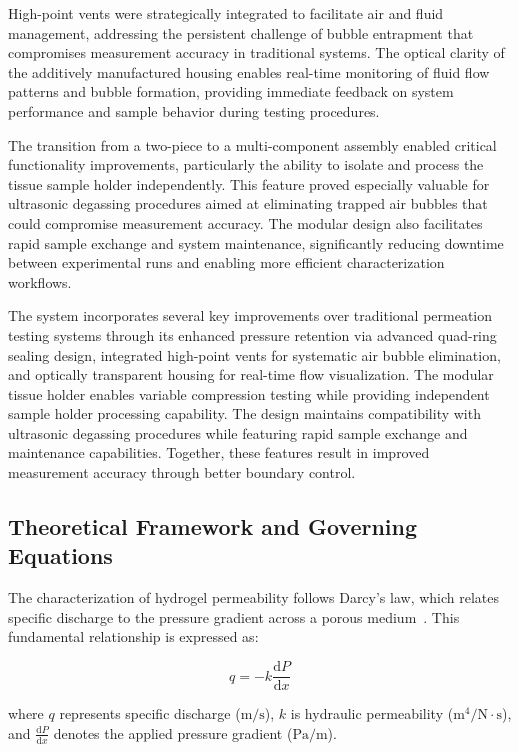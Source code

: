 High-point vents were strategically integrated to facilitate air and fluid management, addressing the persistent challenge of bubble entrapment that compromises measurement accuracy in traditional systems. The optical clarity of the additively manufactured housing enables real-time monitoring of fluid flow patterns and bubble formation, providing immediate feedback on system performance and sample behavior during testing procedures.

The transition from a two-piece to a multi-component assembly enabled critical functionality improvements, particularly the ability to isolate and process the tissue sample holder independently. This feature proved especially valuable for ultrasonic degassing procedures aimed at eliminating trapped air bubbles that could compromise measurement accuracy. The modular design also facilitates rapid sample exchange and system maintenance, significantly reducing downtime between experimental runs and enabling more efficient characterization workflows.

The system incorporates several key improvements over traditional permeation testing systems through its enhanced pressure retention via advanced quad-ring sealing design, integrated high-point vents for systematic air bubble elimination, and optically transparent housing for real-time flow visualization. The modular tissue holder enables variable compression testing while providing independent sample holder processing capability. The design maintains compatibility with ultrasonic degassing procedures while featuring rapid sample exchange and maintenance capabilities. Together, these features result in improved measurement accuracy through better boundary control.

\subsection{Theoretical Framework and Governing Equations}

The characterization of hydrogel permeability follows Darcy's law, which relates specific discharge to the pressure gradient across a porous medium~\cite{ateshian1997finitedeformation}. This fundamental relationship is expressed as:

\begin{equation}
    q = -k \frac{\mathrm{d}P}{\mathrm{d}x}
\end{equation}

where $q$ represents specific discharge ($\mathrm{m/s}$), $k$ is hydraulic permeability ($\mathrm{m^4/N \cdot s}$), and $\frac{\mathrm{d}P}{\mathrm{d}x}$ denotes the applied pressure gradient ($\mathrm{Pa/m}$).

